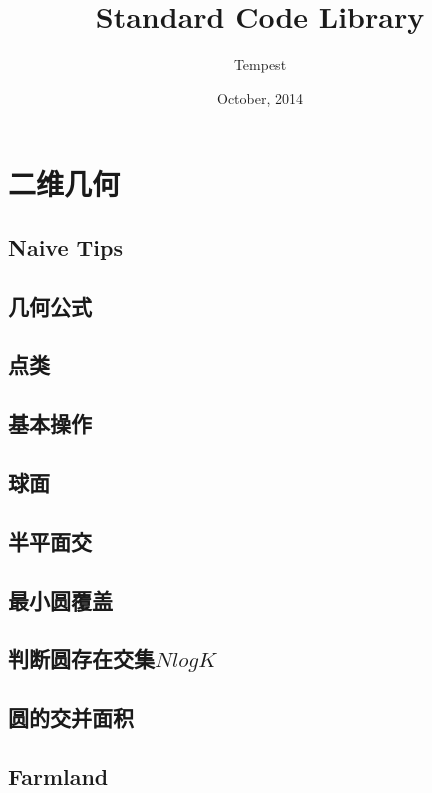 \documentclass[a4paper,10pt]{book}
\title{\LARGE{Standard Code Library}}
\author{Tempest}
\date{October, 2014}
\begin{document}
\maketitle

\tableofcontents

\newpage

\chapter{}

\chapter{二维几何}
	\section{Naive Tips}
		
	\section{几何公式}
		
	\section{点类}
		
	\section{基本操作}
		
	\section{球面}
		
	\section{半平面交}
		
	\section{最小圆覆盖}
		
	\section{判断圆存在交集$NlogK$}
		
	\section{圆的交并面积}
		
	\section{Farmland}
\end{document}
